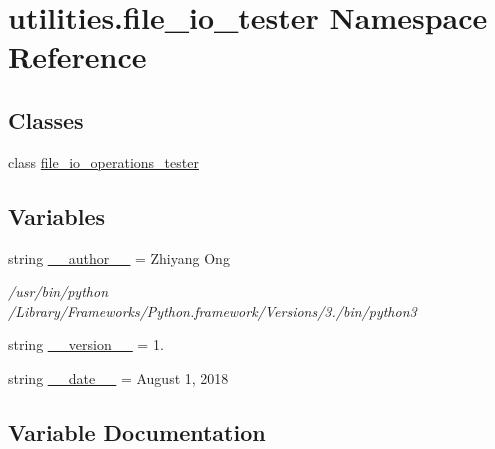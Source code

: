 \hypertarget{namespaceutilities_1_1file__io__tester}{}\section{utilities.\+file\+\_\+io\+\_\+tester Namespace Reference}
\label{namespaceutilities_1_1file__io__tester}
\subsection*{Classes}
\begin{DoxyCompactItemize}
\item 
class \hyperlink{classutilities_1_1file__io__tester_1_1file__io__operations__tester}{file\+\_\+io\+\_\+operations\+\_\+tester}
\end{DoxyCompactItemize}
\subsection*{Variables}
\begin{DoxyCompactItemize}
\item 
string \hyperlink{namespaceutilities_1_1file__io__tester_a1e98e62ebd56ece4ec2a1b305f33aa72}{\+\_\+\+\_\+author\+\_\+\+\_\+} = \textquotesingle{}Zhiyang Ong\textquotesingle{}
\begin{DoxyCompactList}\small\item\em /usr/bin/python /\+Library/\+Frameworks/\+Python.framework/\+Versions/3./bin/python3 \end{DoxyCompactList}\item 
string \hyperlink{namespaceutilities_1_1file__io__tester_a18133e21b0a493dfcb0dcd31bd81a40e}{\+\_\+\+\_\+version\+\_\+\+\_\+} = \textquotesingle{}1.\textquotesingle{}
\item 
string \hyperlink{namespaceutilities_1_1file__io__tester_aff68b27f06e5ed552222d5e8ef71af1b}{\+\_\+\+\_\+date\+\_\+\+\_\+} = \textquotesingle{}August 1, 2018\textquotesingle{}
\end{DoxyCompactItemize}


\subsection{Variable Documentation}
\hypertarget{namespaceutilities_1_1file__io__tester_a1e98e62ebd56ece4ec2a1b305f33aa72}{}
